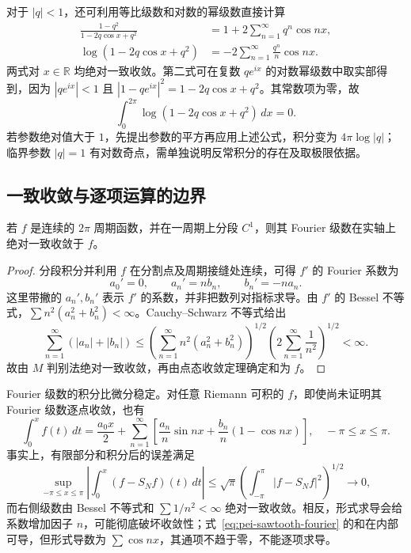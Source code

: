 对于 $|q|<1$，还可利用等比级数和对数的幂级数直接计算
\begin{align*}
 \frac{1-q^2}{1-2q\cos x+q^2}
 &=1+2\sum_{n=1}^{\infty}q^n\cos nx,\\
 \log(1-2q\cos x+q^2)
 &=-2\sum_{n=1}^{\infty}\frac{q^n}{n}\cos nx.
\end{align*}
两式对 $x\in\mathbb R$ 均绝对一致收敛。第二式可在复数 $qe^{ix}$ 的对数幂级数中取实部得到，因为 $|qe^{ix}|<1$ 且 $|1-qe^{ix}|^2=1-2q\cos x+q^2$。其常数项为零，故
\[
 \int_0^{2\pi}\log(1-2q\cos x+q^2)\,dx=0.
\]
若参数绝对值大于 $1$，先提出参数的平方再应用上述公式，积分变为 $4\pi\log|q|$；临界参数 $|q|=1$ 有对数奇点，需单独说明反常积分的存在及取极限依据。

\subsection{一致收敛与逐项运算的边界}

\begin{proposition}
\label{prop:pei-fourier-uniform}
若 $f$ 是连续的 $2\pi$ 周期函数，并在一周期上分段 $C^1$，则其 Fourier 级数在实轴上绝对一致收敛于 $f$。
\end{proposition}
\begin{proof}
分段积分并利用 $f$ 在分割点及周期接缝处连续，可得 $f'$ 的 Fourier 系数为
\[
 a_0'=0,\qquad a_n'=nb_n,\qquad b_n'=-na_n.
\]
这里带撇的 $a_n',b_n'$ 表示 $f'$ 的系数，并非把数列对指标求导。由 $f'$ 的 Bessel 不等式，$\sum n^2(a_n^2+b_n^2)<\infty$。Cauchy--Schwarz 不等式给出
\[
 \sum_{n=1}^{\infty}(|a_n|+|b_n|)
 \leq\left(\sum_{n=1}^{\infty}n^2(a_n^2+b_n^2)\right)^{1/2}
 \left(2\sum_{n=1}^{\infty}\frac1{n^2}\right)^{1/2}<\infty.
\]
故由 $M$ 判别法绝对一致收敛，再由点态收敛定理确定和为 $f$。
\end{proof}

Fourier 级数的积分比微分稳定。对任意 Riemann 可积的 $f$，即使尚未证明其 Fourier 级数逐点收敛，也有
\begin{equation}
 \int_0^xf(t)\,dt
 =\frac{a_0x}{2}+\sum_{n=1}^{\infty}
 \left[\frac{a_n}{n}\sin nx+\frac{b_n}{n}(1-\cos nx)\right],
 \quad -\pi\leq x\leq\pi.
 \label{eq:pei-fourier-integration}
\end{equation}
事实上，有限部分和积分后的误差满足
\[
 \sup_{-\pi\leq x\leq\pi}
 \left|\int_0^x(f-S_Nf)(t)\,dt\right|
 \leq\sqrt\pi\left(\int_{-\pi}^{\pi}|f-S_Nf|^2\right)^{1/2}\longrightarrow0,
\]
而右侧级数由 Bessel 不等式和 $\sum1/n^2<\infty$ 绝对一致收敛。相反，形式求导会给系数增加因子 $n$，可能彻底破坏收敛性；式~\eqref{eq:pei-sawtooth-fourier} 的和在内部可导，但形式导数为 $\sum\cos nx$，其通项不趋于零，不能逐项求导。

